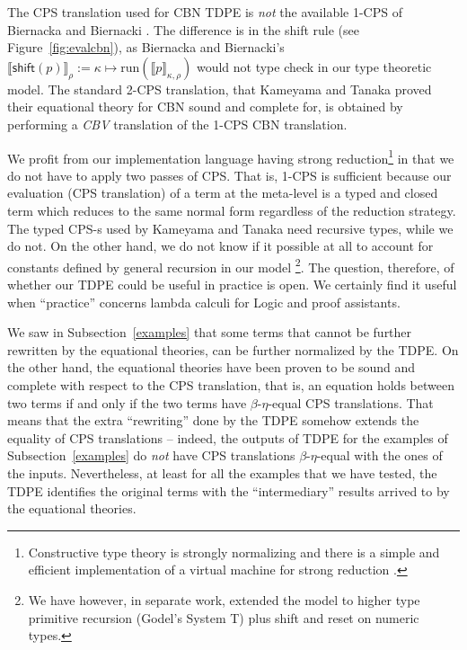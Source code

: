 \documentclass{eptcs}
\newcommand{\shift}[1]{\mathsf{shift}{(#1)}}
\newcommand{\run}[1]{\text{run}{(#1)}}
\newcommand{\eval}[2]{\llbracket{#1}\rrbracket_{#2}}
\theoremstyle{definition}
\theoremstyle{plain}
\theoremstyle{remark}
\begin{document}
The CPS translation used for CBN TDPE is \emph{not} the available 1-CPS of Biernacka and Biernacki \cite{BiernackaB2009}. The difference is in the shift rule (see Figure~\ref{fig:evalcbn}), as Biernacka and Biernacki's
$
    \eval{\shift{p}}{\rho} := \kappa\mapsto\run{\eval{p}{\kappa,\rho}}
$
would not type check in our type theoretic model. The standard 2-CPS translation, that Kameyama and Tanaka \cite{KameyamaTanaka2010} proved their equational theory for CBN sound and complete for, is obtained by performing a \emph{CBV} translation of the 1-CPS CBN translation.

We profit from our implementation language having strong reduction\footnote{Constructive type theory is strongly normalizing and there is a simple and efficient implementation of a virtual machine for strong reduction \cite{GregoireL2002}.} in that we do not have to apply two passes of CPS. That is, 1-CPS is sufficient because our evaluation (CPS translation) of a term at the meta-level is a typed and closed term which reduces to the same normal form regardless of the reduction strategy. The typed CPS-s used by Kameyama and Tanaka need recursive types, while we do not. On the other hand, we do not know if it possible at all to account for constants defined by general recursion in our model \footnote{We have however, in separate work, extended the model to higher type primitive recursion (Godel's System T) plus shift and reset on numeric types.}. The question, therefore, of whether our TDPE could be useful in practice is open. We certainly find it useful when ``practice'' concerns lambda calculi for Logic and proof assistants.

We saw in Subsection~\ref{examples} that some terms that cannot be further rewritten by the equational theories, can be further normalized by the TDPE. On the other hand, the equational theories have been proven to be sound and complete with respect to the CPS translation, that is, an equation holds between two terms if and only if the two terms have $\beta$-$\eta$-equal CPS translations. That means that the extra ``rewriting'' done by the TDPE somehow extends the equality of CPS translations -- indeed, the outputs of TDPE for the examples of Subsection~\ref{examples} do \emph{not} have CPS translations $\beta$-$\eta$-equal with the ones of the inputs. Nevertheless, at least for all the examples that we have tested, the TDPE identifies the original terms with the ``intermediary'' results arrived to by the equational theories.
\end{document}
